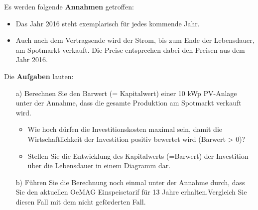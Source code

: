 \documentclass[a4paper,12pt]{article}
\begin{document}
	Es werden folgende \textbf{Annahmen} getroffen:
	\begin{itemize}
		\item Das Jahr 2016 steht exemplarisch für jedes kommende Jahr.
		\item Auch nach dem Vertragsende wird der Strom, bis zum Ende der Lebensdauer, am Spotmarkt verkauft. Die Preise entsprechen dabei den Preisen aus dem Jahr 2016.
	\end{itemize}
	Die \textbf{Aufgaben} lauten:
	\begin{itemize}
		\item[a)] Berechnen Sie den Barwert (= Kapitalwert) einer 10 kWp PV-Anlage unter der Annahme, dass die gesamte Produktion am Spotmarkt verkauft wird.
		\begin{itemize}
			\item Wie hoch dürfen die Investitionskosten maximal sein, damit die Wirtschaftlichkeit der Investition positiv bewertet wird (Barwert > 0)?
			\item Stellen Sie die Entwicklung des Kapitalwerts (=Barwert) der Investition über die Lebensdauer in einem Diagramm dar.
		\end{itemize}
		\item[b)] Führen Sie die Berechnung noch einmal unter der Annahme durch, dass Sie den aktuellen OeMAG Einspeisetarif für 13 Jahre erhalten.\newline Vergleich Sie diesen Fall mit dem nicht geförderten Fall.
	\end{itemize}
\end{document}
